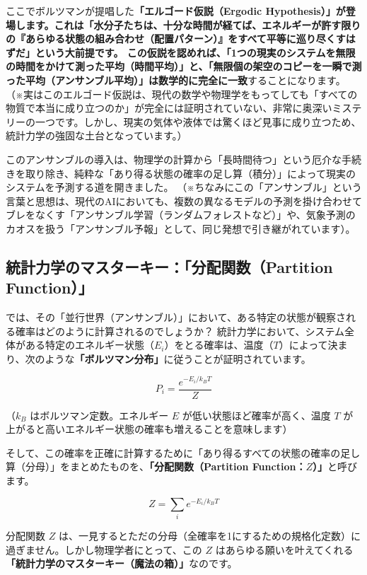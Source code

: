 ここでボルツマンが提唱した\textbf{「エルゴード仮説（Ergodic Hypothesis）」が登場します。これは「水分子たちは、十分な時間が経てば、エネルギーが許す限りの『あらゆる状態の組み合わせ（配置パターン）』をすべて平等に巡り尽くすはずだ」という大前提です。 この仮説を認めれば、「1つの現実のシステムを無限の時間をかけて測った平均（時間平均）」と、「無限個の架空のコピーを一瞬で測った平均（アンサンブル平均）」は数学的に完全に一致}することになります。 （※実はこのエルゴード仮説は、現代の数学や物理学をもってしても「すべての物質で本当に成り立つのか」が完全には証明されていない、非常に奥深いミステリーの一つです。しかし、現実の気体や液体では驚くほど見事に成り立つため、統計力学の強固な土台となっています。）

このアンサンブルの導入は、物理学の計算から「長時間待つ」という厄介な手続きを取り除き、純粋な「あり得る状態の確率の足し算（積分）」によって現実のシステムを予測する道を開きました。 （※ちなみにこの「アンサンブル」という言葉と思想は、現代のAIにおいても、複数の異なるモデルの予測を掛け合わせてブレをなくす「アンサンブル学習（ランダムフォレストなど）」や、気象予測のカオスを扱う「アンサンブル予報」として、同じ発想で引き継がれています）。

\subsection{統計力学のマスターキー：「分配関数（Partition Function）」}

では、その「並行世界（アンサンブル）」において、ある特定の状態が観察される確率はどのように計算されるのでしょうか？ 統計力学において、システム全体がある特定のエネルギー状態（\(E_i\)）をとる確率は、温度（\(T\)）によって決まり、次のような\textbf{「ボルツマン分布」}に従うことが証明されています。

\[
P_i = \frac{e^{-E_i/k_B T}}{Z}
\]

（\(k_B\) はボルツマン定数。エネルギー \(E\) が低い状態ほど確率が高く、温度 \(T\) が上がると高いエネルギー状態の確率も増えることを意味します）

そして、この確率を正確に計算するために「あり得るすべての状態の確率の足し算（分母）」をまとめたものを、\textbf{「分配関数（Partition Function：\(Z\)）」}と呼びます。

\[
Z = \sum_i e^{-E_i/k_B T}
\]

分配関数 \(Z\) は、一見するとただの分母（全確率を1にするための規格化定数）に過ぎません。しかし物理学者にとって、この \(Z\) はあらゆる願いを叶えてくれる\textbf{「統計力学のマスターキー（魔法の箱）」}なのです。

